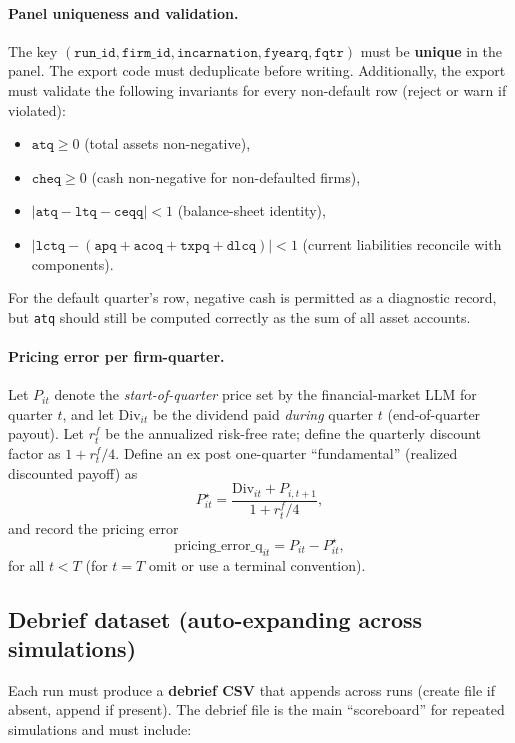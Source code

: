 \documentclass[11pt]{article}
\begin{document}
\paragraph{Panel uniqueness and validation.}
The key $(\texttt{run\_id},\texttt{firm\_id},\texttt{incarnation},\texttt{fyearq},\texttt{fqtr})$ must be \textbf{unique} in the panel.  The export code must deduplicate before writing.  Additionally, the export must validate the following invariants for every non-default row (reject or warn if violated):
\begin{itemize}[leftmargin=*]
    \item $\texttt{atq}\ge 0$ (total assets non-negative),
    \item $\texttt{cheq}\ge 0$ (cash non-negative for non-defaulted firms),
    \item $|\texttt{atq}-\texttt{ltq}-\texttt{ceqq}|<1$ (balance-sheet identity),
    \item $|\texttt{lctq}-(\texttt{apq}+\texttt{acoq}+\texttt{txpq}+\texttt{dlcq})|<1$ (current liabilities reconcile with components).
\end{itemize}
For the default quarter's row, negative cash is permitted as a diagnostic record, but \texttt{atq} should still be computed correctly as the sum of all asset accounts.

\paragraph{Pricing error per firm-quarter.}
Let $P_{it}$ denote the \emph{start-of-quarter} price set by the financial-market LLM for quarter $t$, and let $\text{Div}_{it}$ be the dividend paid \emph{during} quarter $t$ (end-of-quarter payout). Let $r^f_t$ be the annualized risk-free rate; define the quarterly discount factor as $1+r^f_t/4$.
Define an ex post one-quarter ``fundamental'' (realized discounted payoff) as
\[
P^{\star}_{it}=\frac{\text{Div}_{it}+P_{i,t+1}}{1+r^f_t/4},
\]
and record the pricing error
\[
\text{pricing\_error\_q}_{it}=P_{it}-P^{\star}_{it},
\]
for all $t<T$ (for $t=T$ omit or use a terminal convention).

\subsection{Debrief dataset (auto-expanding across simulations)}
Each run must produce a \textbf{debrief CSV} that appends across runs (create file if absent, append if present). 
The debrief file is the main ``scoreboard'' for repeated simulations and must include:
\end{document}
